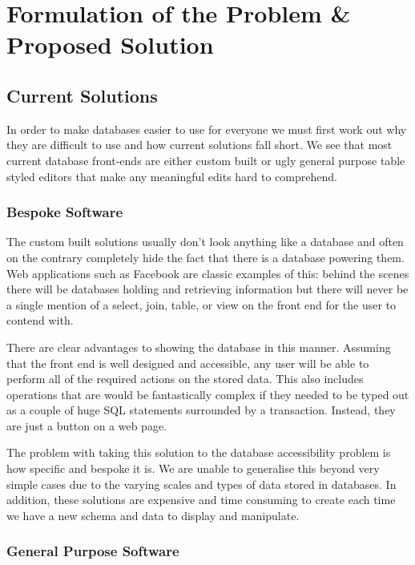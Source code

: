 \chapter{Formulation of the Problem \& Proposed Solution}

\section{Current Solutions}

In order to make databases easier to use for everyone we must first work out why they are difficult to use and how current solutions fall short. We see that most current database front-ends are either custom built or ugly general purpose table styled editors that make any meaningful edits hard to comprehend.

\subsection{Bespoke Software}

The custom built solutions usually don't look anything like a database and often on the contrary completely hide the fact that there is a database powering them. Web applications such as Facebook are classic examples of this: behind the scenes there will be databases holding and retrieving information but there will never be a single mention of a select, join, table, or view on the front end for the user to contend with.

There are clear advantages to showing the database in this manner. Assuming that the front end is well designed and accessible, any user will be able to perform all of the required actions on the stored data. This also includes operations that are would be fantastically complex if they needed to be typed out as a couple of huge \ac{SQL} statements surrounded by a transaction. Instead, they are just a button on a web page.

The problem with taking this solution to the database accessibility problem is how specific and bespoke it is. We are unable to generalise this beyond very simple cases due to the varying scales and types of data stored in databases. In addition, these solutions are expensive and time consuming to create each time we have a new schema and data to display and manipulate.

\subsection{General Purpose Software}

